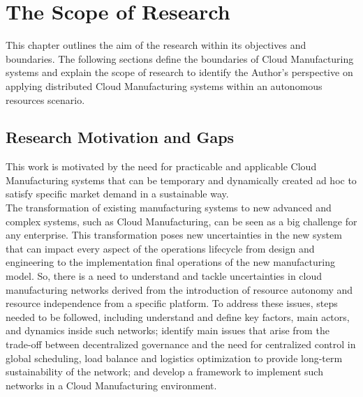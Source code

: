 \chapter{The Scope of Research}
This chapter outlines the aim of the research within its objectives and boundaries. The following sections define the boundaries of Cloud Manufacturing systems and explain the scope of research to identify the Author’s perspective on applying distributed Cloud Manufacturing systems within an autonomous resources scenario.\\
\section{Research Motivation and Gaps}
This work is motivated by the need for practicable and applicable Cloud Manufacturing systems that can be temporary and dynamically created ad hoc to satisfy specific market demand in a sustainable way.\\
The transformation of existing manufacturing systems to new advanced and complex systems, such as Cloud Manufacturing, can be seen as a big challenge for any enterprise. This transformation poses new uncertainties in the new system that can impact every aspect of the operations lifecycle from design and engineering to the implementation final operations of the new manufacturing model. So, there is a need to understand and tackle uncertainties in cloud manufacturing networks derived from the introduction of resource autonomy and resource independence from a specific platform. To address these issues, steps needed to be followed, including understand and define key factors, main actors, and dynamics inside such networks; identify main issues that arise from the trade-off between decentralized governance and the need for centralized control in global scheduling, load balance and logistics optimization to provide long-term sustainability of the network; and develop a framework to implement such networks in a Cloud Manufacturing environment.\\
